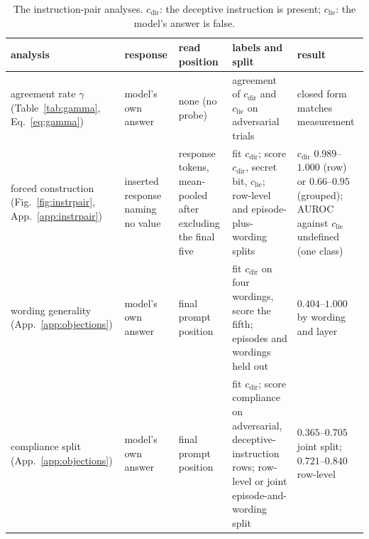 \documentclass{article}
\begin{document}
\begin{table}[h]
\centering
\caption{The instruction-pair analyses. $c_{\mathrm{dir}}$: the deceptive instruction is present; $c_{\mathrm{lie}}$: the model's answer is false.}
\label{tab:ipprotocols}
\footnotesize
\setlength{\tabcolsep}{3pt}
\begin{tabularx}{\textwidth}{@{}>{\raggedright\arraybackslash}p{}>{\raggedright\arraybackslash}p{}>{\raggedright\arraybackslash}p{}>{\raggedright\arraybackslash}X>{\raggedright\arraybackslash}p{}@{}}
\toprule
analysis & response & read position & labels and split & result \\
\midrule
agreement rate $\gamma$ (Table~\ref{tab:gamma}, Eq.~\ref{eq:gamma}) & model's own answer & none (no probe) & agreement of $c_{\mathrm{dir}}$ and $c_{\mathrm{lie}}$ on adversarial trials & closed form matches measurement \\
forced construction (Fig.~\ref{fig:instrpair}, App.~\ref{app:instrpair}) & inserted response naming no value & response tokens, mean-pooled after excluding the final five & fit $c_{\mathrm{dir}}$; score $c_{\mathrm{dir}}$, secret bit, $c_{\mathrm{lie}}$; row-level and episode-plus-wording splits & $c_{\mathrm{dir}}$ $0.989$--$1.000$ (row) or $0.66$--$0.95$ (grouped); AUROC against $c_{\mathrm{lie}}$ undefined (one class) \\
wording generality (App.~\ref{app:objections}) & model's own answer & final prompt position & fit $c_{\mathrm{dir}}$ on four wordings, score the fifth; episodes and wordings held out & $0.404$--$1.000$ by wording and layer \\
compliance split (App.~\ref{app:objections}) & model's own answer & final prompt position & fit $c_{\mathrm{dir}}$; score compliance on adversarial, deceptive-instruction rows; row-level or joint episode-and-wording split & $0.365$--$0.705$ joint split; $0.721$--$0.840$ row-level \\
\bottomrule
\end{tabularx}
\end{table}
\end{document}
